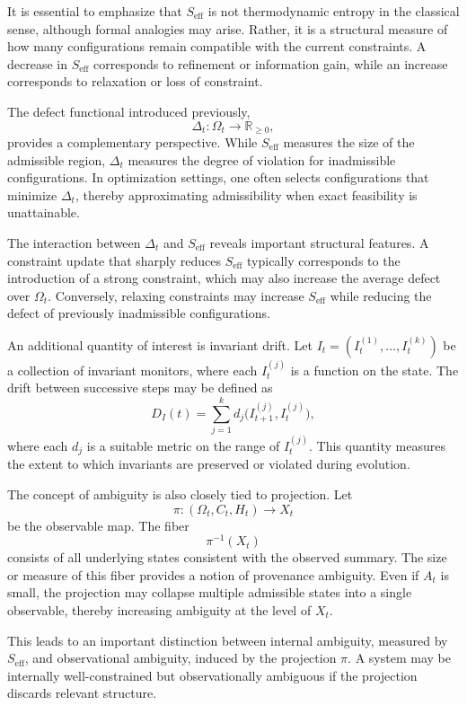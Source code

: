 \documentclass[11pt,oneside]{article}
\begin{document}
It is essential to emphasize that \( S_{\mathrm{eff}} \) is not thermodynamic entropy in the classical sense, although formal analogies may arise. Rather, it is a structural measure of how many configurations remain compatible with the current constraints. A decrease in \( S_{\mathrm{eff}} \) corresponds to refinement or information gain, while an increase corresponds to relaxation or loss of constraint.

The defect functional introduced previously,
\[
\Delta_t : \Omega_t \to \mathbb{R}_{\ge 0},
\]
provides a complementary perspective. While \( S_{\mathrm{eff}} \) measures the size of the admissible region, \( \Delta_t \) measures the degree of violation for inadmissible configurations. In optimization settings, one often selects configurations that minimize \( \Delta_t \), thereby approximating admissibility when exact feasibility is unattainable.

The interaction between \( \Delta_t \) and \( S_{\mathrm{eff}} \) reveals important structural features. A constraint update that sharply reduces \( S_{\mathrm{eff}} \) typically corresponds to the introduction of a strong constraint, which may also increase the average defect over \( \Omega_t \). Conversely, relaxing constraints may increase \( S_{\mathrm{eff}} \) while reducing the defect of previously inadmissible configurations.

An additional quantity of interest is invariant drift. Let \( I_t = (I_t^{(1)}, \dots, I_t^{(k)}) \) be a collection of invariant monitors, where each \( I_t^{(j)} \) is a function on the state. The drift between successive steps may be defined as
\[
D_I(t) = \sum_{j=1}^{k} d_j\bigl(I_{t+1}^{(j)}, I_t^{(j)}\bigr),
\]
where each \( d_j \) is a suitable metric on the range of \( I_t^{(j)} \). This quantity measures the extent to which invariants are preserved or violated during evolution.

The concept of ambiguity is also closely tied to projection. Let
\[
\pi : (\Omega_t, C_t, H_t) \to X_t
\]
be the observable map. The fiber
\[
\pi^{-1}(X_t)
\]
consists of all underlying states consistent with the observed summary. The size or measure of this fiber provides a notion of provenance ambiguity. Even if \( A_t \) is small, the projection may collapse multiple admissible states into a single observable, thereby increasing ambiguity at the level of \( X_t \).

This leads to an important distinction between internal ambiguity, measured by \( S_{\mathrm{eff}} \), and observational ambiguity, induced by the projection \( \pi \). A system may be internally well-constrained but observationally ambiguous if the projection discards relevant structure.
\end{document}
